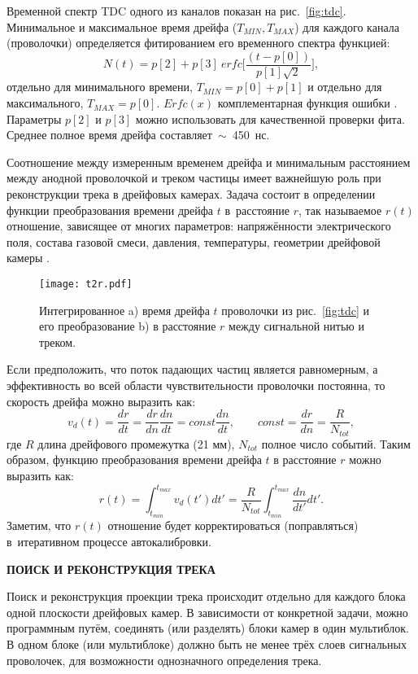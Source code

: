 Временной спектр TDC одного из каналов показан на рис.~\ref{fig:tdc}.
Минимальное и максимальное время дрейфа ($T_{MIN}, T_{MAX}$) для каждого канала
(проволочки) определяется фитированием его временного спектра функцией:
\[
N(t) = p[2] + p[3]\ erfc \Biggl[ \frac{(t - p[0])}{p[1] \sqrt{2}} \Biggr],
\]
отдельно для минимального времени, $T_{MIN} = p[0] + p[1]$ и отдельно для
максимального, $T_{MAX} = p[0]$. $Erfc(x)$ комплементарная функция ошибки
\cite{erfc:web}. Параметры $p[2]$ и $p[3]$ можно использовать для качественной
проверки фита. Среднее полное время дрейфа составляет~$\sim$~450~нс.

Соотношение между измеренным временем дрейфа и минимальным расстоянием между
анодной проволочкой и треком частицы имеет важнейшую роль при реконструкции
трека в дрейфовых камерах. Задача состоит в определении функции преобразования
времени дрейфа $t$ в~расстояние $r$, так называемое $r(t)$ отношение, зависящее
от многих параметров: напряжённости электрического поля, состава газовой смеси,
давления, температуры, геометрии дрейфовой камеры \cite{peshenov:1986}.

\begin{figure}[h]
  \begin{center}
    \texttt{[image: t2r.pdf]}
    \caption {Интегрированное a) время дрейфа $t$ проволочки из
      рис.~\ref{fig:tdc} и его преобразование b) в расстояние $r$ между
      сигнальной нитью и треком.}
    \label{fig:t2r}
  \end{center}
\end{figure}

Если предположить, что поток падающих частиц является равномерным,
а эффективность во всей области чувствительности проволочки постоянна,
то скорость дрейфа можно выразить как:
\[
v_{d}(t) = \frac{dr}{dt} = \frac{dr}{dn} \frac{dn}{dt} = const \frac{dn}{dt},
\qquad const = \frac{dr}{dn} = \frac{R}{N_{tot}},
\]
где $R$ длина дрейфового промежутка (21 мм), $N_{tot}$ полное число событий.
Таким образом, функцию преобразования времени дрейфа $t$ в расстояние $r$ можно
выразить как:
\[
r(t) = \int_{t_{min}}^{t_{max}} v_{d}(t') dt' = \frac{R}{N_{tot}} \int_{t_{min}}^{t_{max}} \frac{dn}{dt'}dt'.
\]
Заметим, что $r(t)$ отношение будет корректироваться (поправляться)
в~итеративном процессе автокалибровки.

\vspace* {0.5cm}
\begin{center} \bf{ПОИСК И РЕКОНСТРУКЦИЯ ТРЕКА} \end{center}

Поиск и реконструкция проекции трека происходит отдельно для каждого блока
одной плоскости дрейфовых камер. В зависимости от конкретной задачи, можно
программным путём, соединять (или разделять) блоки камер в один мультиблок.
В одном блоке (или мультиблоке) должно быть не менее трёх слоев сигнальных
проволочек, для возможности однозначного определения трека.

